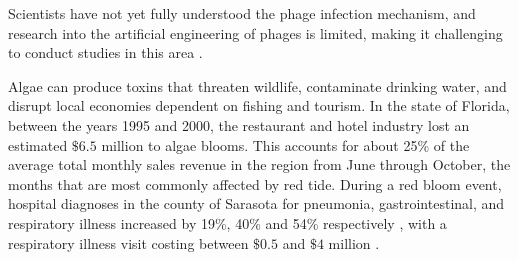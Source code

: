 Scientists have not yet fully understood the phage infection mechanism, and research into the artificial engineering of phages is limited, making it challenging to conduct studies in this area \cite{grassoReviewCyanophageHost2022, DissolvedMicrocystinRelease}.\newline 
    
Algae can produce toxins that threaten wildlife, contaminate drinking water, and disrupt local economies dependent on fishing and tourism.
In the state of Florida, between the years 1995 and 2000, the restaurant and hotel industry lost an estimated $\$6.5$ million to algae blooms.
This accounts for about 25\% of the average total monthly sales revenue in the region from June through October, the months that are most commonly affected by red tide\cite{PDFEconomicImpacts}.
During a red bloom event, hospital diagnoses in the county of Sarasota for pneumonia, gastrointestinal, and respiratory illness increased by 19\%, 40\% and 54\% respectively \cite{chengCharacterizationMarineAerosol2005, kirkpatrickGastrointestinalEmergencyRoom2010}, with a respiratory illness visit costing between $\$0.5$ and $\$4$ million \cite{hoaglandCostsRespiratoryIllnesses2009}. 